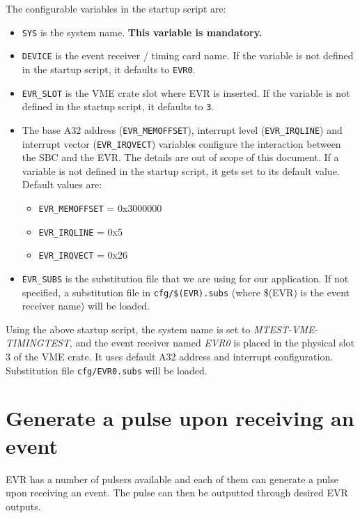 \documentclass[12pt,a4paper]{article}
\begin{document}
\begin{enumerate}
The configurable variables in the startup script are:
\begin{itemize}
	\item
		\texttt{SYS} is the system name. \textbf{This variable is mandatory.}
	\item 
		\texttt{DEVICE} is the event receiver / timing card name. If the variable is not defined in the startup script, it defaults to \texttt{EVR0}.
	\item 
		\texttt{EVR\_SLOT} is the VME crate slot where EVR is inserted. If the variable is not defined in the startup script, it defaults to \texttt{3}.
	\item 
		The base A32 address (\texttt{EVR\_MEMOFFSET}), interrupt level (\texttt{EVR\_IRQLINE}) and interrupt vector (\texttt{EVR\_IRQVECT}) variables configure the interaction between the SBC and the EVR. The details are out of scope of this document. If a variable is not defined in the startup script, it gets set to its default value. Default values are:
		\begin{itemize}
		\item \texttt{EVR\_MEMOFFSET} = 0x3000000
		\item \texttt{EVR\_IRQLINE} = 0x5
		\item \texttt{EVR\_IRQVECT} = 0x26
		\end{itemize}
	\item 
		\texttt{EVR\_SUBS} is the substitution file that we are using for our application. If not specified, a substitution file in \texttt{cfg/\$(EVR).subs} (where \$(EVR) is the event receiver name) will be loaded.
\end{itemize}
Using the above startup script, the system name is set to \textit{MTEST-VME-TIMINGTEST}, and the event receiver named \textit{EVR0} is placed in the physical slot 3 of the VME crate. It uses default A32 address and interrupt configuration. Substitution file \texttt{cfg/EVR0.subs} will be loaded.
\end{enumerate}


\section{Generate a pulse upon receiving an event}
EVR has a number of pulsers available and each of them can generate a pulse upon receiving an event. The pulse can then be outputted through desired EVR outputs. 
\end{document}
